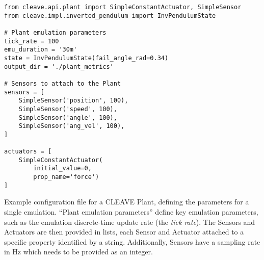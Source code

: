 \begin{listing}
    \begin{verbatim}
from cleave.api.plant import SimpleConstantActuator, SimpleSensor
from cleave.impl.inverted_pendulum import InvPendulumState

# Plant emulation parameters
tick_rate = 100
emu_duration = '30m'
state = InvPendulumState(fail_angle_rad=0.34)
output_dir = './plant_metrics'

# Sensors to attach to the Plant
sensors = [
    SimpleSensor('position', 100),
    SimpleSensor('speed', 100),
    SimpleSensor('angle', 100),
    SimpleSensor('ang_vel', 100),
]

actuators = [
    SimpleConstantActuator(
        initial_value=0,
        prop_name='force')
]
    \end{verbatim}
    \caption{
        Example configuration file for a CLEAVE Plant, defining the parameters for a single emulation.
        ``Plant emulation parameters'' define key emulation parameters, such as the emulation discrete-time update rate (the \emph{tick rate}).
        The Sensors and Actuators are then provided in lists, each Sensor and Actuator attached to a specific property identified by a string.
        Additionally, Sensors have a sampling rate in Hz which needs to be provided as an integer.
    }
    \label{lst:config:plant}
\end{listing}
